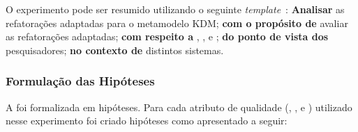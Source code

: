 O experimento pode ser resumido utilizando o seguinte \textit{template}~\cite{Wohlin}: \textbf{Analisar} as refatorações adaptadas para o metamodelo KDM; \textbf{com o propósito de} avaliar as refatorações adaptadas; \textbf{com respeito a} , ,  e ; \textbf{do ponto de vista dos} pesquisadores; \textbf{no contexto de} distintos sistemas.

\subsubsection{Formulação das Hipóteses}



A  foi formalizada em hipóteses. Para cada atributo de qualidade (, ,  e ) utilizado nesse experimento foi criado hipóteses como apresentado a seguir:


